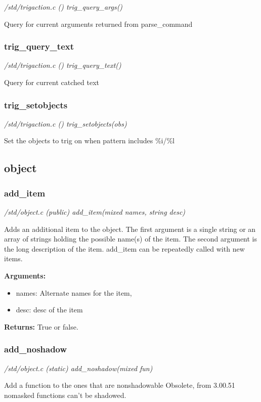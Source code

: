 {\em /std/trigaction.c () trig\_query\_args()}

Query for current arguments returned from parse\_command


\subsubsection{trig\_query\_text}

{\em /std/trigaction.c () trig\_query\_text()}

Query for current catched text


\subsubsection{trig\_setobjects}

{\em /std/trigaction.c () trig\_setobjects(obs)}

Set the objects to trig on when pattern includes \%i/\%l


\subsection{object}
\subsubsection{add\_item}

{\em /std/object.c (public) add\_item(mixed names, string desc)}

Adds an additional item to the object. The first 
argument is a single string or an array of 
strings holding the possible name(s) of the item.
The second argument is the long description of 
the item. add\_item can be repeatedly called with 
new items.

{\bf Arguments:}
\begin{itemize}
\item     names: Alternate names for the item, 
\item desc: desc of the item
\end{itemize}

{\bf Returns:}    True or false.


\subsubsection{add\_noshadow}

{\em /std/object.c (static) add\_noshadow(mixed fun)}

Add a function to the ones that are nonshadowable
Obsolete, from 3.00.51 nomasked functions can't be
shadowed.


